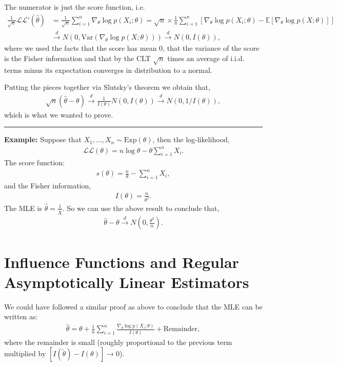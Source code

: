 \documentclass[twoside,12pt]{article}
\newenvironment{proof}{{\bf Proof:}}{\hfill\rule{2mm}{2mm}}
\newcommand{\cdist}{\overset{d}{\rightarrow}}
\begin{document}
\begin{proof}
The numerator is just the score function, i.e.
\begin{align*}
\frac{1}{\sqrt{n}}\mathcal{LL}'(\widehat{\theta}) &=  \frac{1}{\sqrt{n}} \sum_{i=1}^n \nabla_{\theta} \log p(X_i; \theta) = \sqrt{n} \times \frac{1}{n} \sum_{i=1}^n\left[ \nabla_{\theta} \log p(X_i; \theta) - \mathbb{E}[\nabla_{\theta} \log p(X; \theta)] \right] \\
&\cdist N(0, \text{Var}(\nabla_{\theta} \log p(X; \theta))) \cdist N(0,I(\theta)),
\end{align*}
where we used the facts that the score has mean 0, that the variance of the score is the Fisher information and that by the CLT $\sqrt{n}$ times an average of i.i.d. terms minus its expectation converges in distribution to a normal.

Putting the pieces together via Slutsky's theorem we obtain that,
\begin{align*}
\sqrt{n}(\widehat{\theta}- \theta) \cdist \frac{1}{I(\theta)} N(0, I(\theta)) \cdist N(0, 1/I(\theta)),
\end{align*}
which is what we wanted to prove.
\end{proof}

{\bf Example: } Suppose that $X_1,\ldots,X_n \sim \text{Exp}(\theta)$, then the log-likelihood,
\begin{align*}
\mathcal{LL}(\theta) = n \log \theta - \theta \sum_{i=1}^n X_i.
\end{align*}
The score function:
\begin{align*}
s(\theta) = \frac{n}{\theta} - \sum_{i=1}^n X_i,
\end{align*}
and the Fisher information,
\begin{align*}
I(\theta) = \frac{n}{\theta^2}.
\end{align*}
The MLE is $\widehat{\theta} = \frac{1}{\overline{X}}.$
So we can use the above result to conclude that,
\begin{align*}
\widehat{\theta} - \theta \cdist N\left(0, \frac{\theta^2}{n}\right).
\end{align*}


\section{Influence Functions and Regular Asymptotically Linear Estimators}
We could have followed a similar proof as above to conclude that the MLE can be written as:
\begin{align*}
\widehat{\theta} = \theta + \frac{1}{n} \sum_{i=1}^n \frac{\nabla_{\theta} \log p(X_i; \theta)}{I(\theta)} + \text{Remainder},
\end{align*}
where the remainder is small (roughly proportional to the previous term multiplied by $[I(\widetilde{\theta}) - I(\theta)] \rightarrow 0$).
\end{document}
